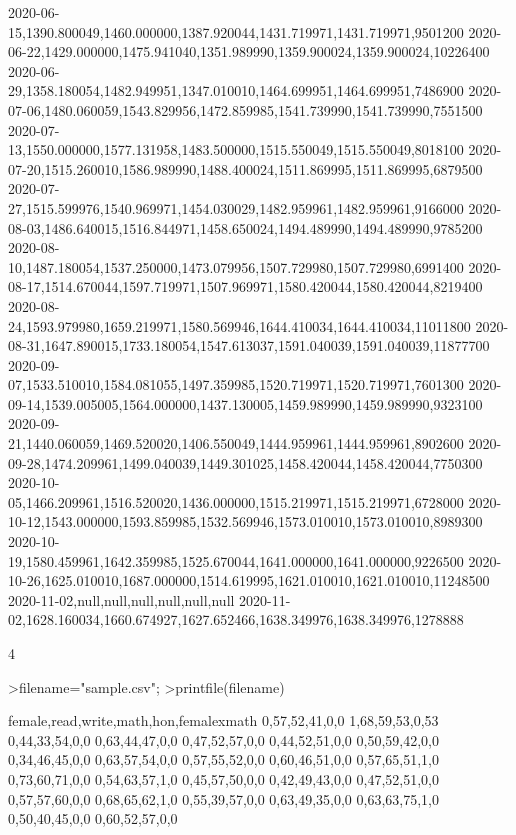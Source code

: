 \documentclass{article}
\begin{document}
\begin{eulernotebook}
\begin{eulercomment}
\begin{eulercomment}
\begin{euleroutput}
  2020-06-15,1390.800049,1460.000000,1387.920044,1431.719971,1431.719971,9501200
  2020-06-22,1429.000000,1475.941040,1351.989990,1359.900024,1359.900024,10226400
  2020-06-29,1358.180054,1482.949951,1347.010010,1464.699951,1464.699951,7486900
  2020-07-06,1480.060059,1543.829956,1472.859985,1541.739990,1541.739990,7551500
  2020-07-13,1550.000000,1577.131958,1483.500000,1515.550049,1515.550049,8018100
  2020-07-20,1515.260010,1586.989990,1488.400024,1511.869995,1511.869995,6879500
  2020-07-27,1515.599976,1540.969971,1454.030029,1482.959961,1482.959961,9166000
  2020-08-03,1486.640015,1516.844971,1458.650024,1494.489990,1494.489990,9785200
  2020-08-10,1487.180054,1537.250000,1473.079956,1507.729980,1507.729980,6991400
  2020-08-17,1514.670044,1597.719971,1507.969971,1580.420044,1580.420044,8219400
  2020-08-24,1593.979980,1659.219971,1580.569946,1644.410034,1644.410034,11011800
  2020-08-31,1647.890015,1733.180054,1547.613037,1591.040039,1591.040039,11877700
  2020-09-07,1533.510010,1584.081055,1497.359985,1520.719971,1520.719971,7601300
  2020-09-14,1539.005005,1564.000000,1437.130005,1459.989990,1459.989990,9323100
  2020-09-21,1440.060059,1469.520020,1406.550049,1444.959961,1444.959961,8902600
  2020-09-28,1474.209961,1499.040039,1449.301025,1458.420044,1458.420044,7750300
  2020-10-05,1466.209961,1516.520020,1436.000000,1515.219971,1515.219971,6728000
  2020-10-12,1543.000000,1593.859985,1532.569946,1573.010010,1573.010010,8989300
  2020-10-19,1580.459961,1642.359985,1525.670044,1641.000000,1641.000000,9226500
  2020-10-26,1625.010010,1687.000000,1514.619995,1621.010010,1621.010010,11248500
  2020-11-02,null,null,null,null,null,null
  2020-11-02,1628.160034,1660.674927,1627.652466,1638.349976,1638.349976,1278888
\end{euleroutput}
\begin{eulercomment}
4
\end{eulercomment}
\begin{eulerprompt}
>filename="sample.csv";
>printfile(filename)
\end{eulerprompt}
\begin{euleroutput}
  female,read,write,math,hon,femalexmath
  0,57,52,41,0,0
  1,68,59,53,0,53
  0,44,33,54,0,0
  0,63,44,47,0,0
  0,47,52,57,0,0
  0,44,52,51,0,0
  0,50,59,42,0,0
  0,34,46,45,0,0
  0,63,57,54,0,0
  0,57,55,52,0,0
  0,60,46,51,0,0
  0,57,65,51,1,0
  0,73,60,71,0,0
  0,54,63,57,1,0
  0,45,57,50,0,0
  0,42,49,43,0,0
  0,47,52,51,0,0
  0,57,57,60,0,0
  0,68,65,62,1,0
  0,55,39,57,0,0
  0,63,49,35,0,0
  0,63,63,75,1,0
  0,50,40,45,0,0
  0,60,52,57,0,0

\end{euleroutput}
\end{eulercomment}
\end{eulercomment}
\end{eulernotebook}
\end{document}
